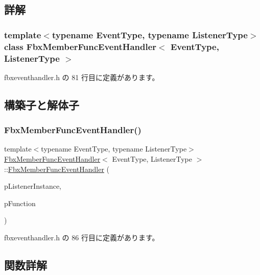 \subsection{詳解}
\subsubsection*{template$<$typename Event\+Type, typename Listener\+Type$>$\newline
class Fbx\+Member\+Func\+Event\+Handler$<$ Event\+Type, Listener\+Type $>$}



 fbxeventhandler.\+h の 81 行目に定義があります。



\subsection{構築子と解体子}
\mbox{\label{class_fbx_member_func_event_handler_aea54f8e7f5579f28f715c5a9b8e1e9d5}} 
\subsubsection{\texorpdfstring{Fbx\+Member\+Func\+Event\+Handler()}{FbxMemberFuncEventHandler()}}
{\footnotesize\ttfamily template$<$typename Event\+Type, typename Listener\+Type$>$ \\
\hyperlink{class_fbx_member_func_event_handler}{Fbx\+Member\+Func\+Event\+Handler}$<$ Event\+Type, Listener\+Type $>$\+::\hyperlink{class_fbx_member_func_event_handler}{Fbx\+Member\+Func\+Event\+Handler} (\begin{DoxyParamCaption}\item[{Listener\+Type $\ast$}]{p\+Listener\+Instance,  }\item[{Callback\+Fnc}]{p\+Function }\end{DoxyParamCaption})\hspace{0.3cm}{\ttfamily [inline]}}



 fbxeventhandler.\+h の 86 行目に定義があります。



\subsection{関数詳解}
\mbox{\label{class_fbx_member_func_event_handler_a4bcb037442927d480776bc2fb4b7bcd6}} 
